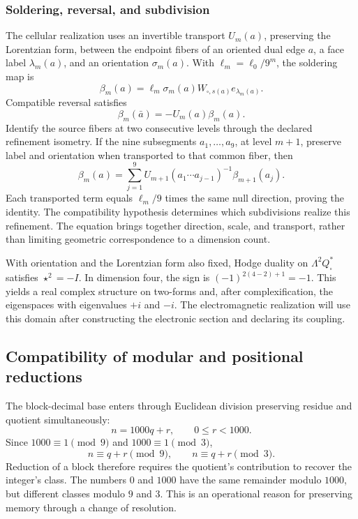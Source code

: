\subsubsection{Soldering, reversal, and subdivision}

The cellular realization uses an invertible transport \(U_m(a)\),
preserving the Lorentzian form, between the endpoint fibers of an
oriented dual edge \(a\), a face label \(\lambda_m(a)\),
and an orientation \(\sigma_m(a)\).
With \(\ell_m=\ell_0/9^m\), the soldering map is
\[
 \beta_m(a)=\ell_m\sigma_m(a)
 W_{\square,s(a)}e_{\lambda_m(a)}.
\]
Compatible reversal satisfies
\[
 \beta_m(\bar a)=-U_m(a)\beta_m(a).
\]
Identify the source fibers at two consecutive levels through the declared
refinement isometry. If the nine subsegments \(a_1,\ldots,a_9\),
at level \(m+1\), preserve label and orientation when transported
to that common fiber, then
\begin{equation}
 \beta_m(a)=\sum_{j=1}^9
 U_{m+1}(a_1\cdots a_{j-1})^{-1}\beta_{m+1}(a_j).
 \label{eq:soldadura-refinamiento}
\end{equation}
Each transported term equals \(\ell_m/9\) times the same null
direction, proving the identity. The compatibility hypothesis determines
which subdivisions realize this refinement. The equation brings together
direction, scale, and transport, rather than limiting geometric
correspondence to a dimension count.

With orientation and the Lorentzian form also fixed, Hodge duality
on \(\Lambda^2Q_\square^*\) satisfies \(\star^2=-I\).
In dimension four, the sign is \((-1)^{2(4-2)+1}=-1\).
This yields a real complex structure on two-forms and, after
complexification, the eigenspaces with eigenvalues \(+i\) and \(-i\).
The electromagnetic realization will use this domain after constructing
the electronic section and declaring its coupling.

\subsection{Compatibility of modular and positional reductions}

The block-decimal base enters through Euclidean division preserving
residue and quotient simultaneously:
\[
 n=1000q+r,\qquad 0\le r<1000.
\]
Since \(1000\equiv1\pmod9\) and \(1000\equiv1\pmod3\),
\[
 n\equiv q+r\pmod9,\qquad n\equiv q+r\pmod3.
\]
Reduction of a block therefore requires the quotient's contribution
to recover the integer's class. The numbers \(0\) and \(1000\)
have the same remainder modulo \(1000\), but different classes
modulo \(9\) and \(3\). This is an operational reason for preserving
memory through a change of resolution.


